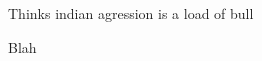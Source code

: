 \documentclass[char]{NeptuneBall}
\begin{document}
\name{\cDancer{}}

Thinks indian agression is a load of bull


\begin{itemz}[Goals]
  \item Blah
\end{itemz}

\begin{contacts}
  \contact{}
\end{contacts}
\end{document}
